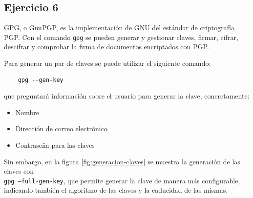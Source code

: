 \subsection{Ejercicio 6}
\graphicspath{ {img/06} }

GPG, o GnuPGP, es la implementación de GNU del estándar de criptografía PGP. Con el comando \texttt{gpg} se pueden generar y gestionar claves, firmar, cifrar, descifrar y comprobar la firma de documentos encriptados con PGP.

Para generar un par de claves se puede utilizar el siguiente comando:
\begin{verbatim}
    gpg --gen-key
\end{verbatim}

que preguntará información sobre el usuario para generar la clave, concretamente:
\begin{itemize}
    \item{Nombre}
    \item{Dirección de correo electrónico}
    \item{Contraseña para las claves}
\end{itemize}

Sin embargo, en la figura \ref{fig:generacion-claves} se muestra la generación de las claves con \\ \texttt{gpg --full-gen-key}, que permite generar la clave de manera más configurable, indicando también el algoritmo de las claves y la caducidad de las mismas.

